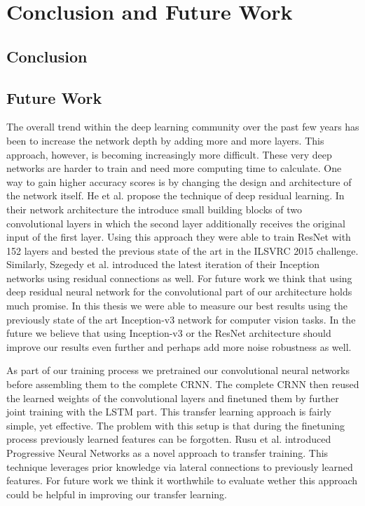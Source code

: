\section{Conclusion and Future Work}
\label{sec:summary}

\subsection{Conclusion}
\subsection{Future Work}
The overall trend within the deep learning community over the past few years has been to increase the network depth by adding more and more layers. This approach, however, is becoming increasingly more difficult. These very deep networks are harder to train and need more computing time to calculate. One way to gain higher accuracy scores is by changing the design and architecture of the network itself. He et al. propose the technique of deep residual learning\cite{he2016deep}. In their network architecture the introduce small building blocks of two convolutional layers in which the second layer additionally receives the original input of the first layer. \cite{he2016deep} Using this approach they were able to train ResNet with 152 layers and bested the previous state of the art in the ILSVRC 2015 challenge. Similarly, Szegedy et al. introduced the latest iteration of their Inception networks using residual connections\cite{szegedy2016inception} as well. 
For future work we think that using deep residual neural network for the convolutional part of our architecture holds much promise. In this thesis we were able to measure our best results using the previously state of the art Inception-v3 network for computer vision tasks. In the future we believe that using Inception-v3 or the ResNet architecture should improve our results even further and perhaps add more noise robustness as well.

As part of our training process we pretrained our convolutional neural networks before assembling them to the complete CRNN. The complete CRNN then reused the learned weights of the convolutional layers and finetuned them by further joint training with the LSTM part. This transfer learning approach is fairly simple, yet effective. The problem with this setup is that during the finetuning process previously learned features can be forgotten. Rusu et al. introduced Progressive Neural Networks\cite{rusu2016progressive} as a novel approach to transfer training. This technique leverages prior knowledge via lateral connections to previously learned features. For future work we think it worthwhile to evaluate wether this approach could be helpful in improving our transfer learning.

